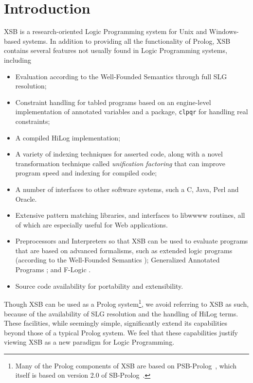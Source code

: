 \chapter{Introduction} \label{introduction}

XSB is a research-oriented Logic Programming system for Unix and
Windows-based systems.  In addition to providing all the
functionality of Prolog, XSB contains several features not usually
found in Logic Programming systems, including
\begin{itemize}
\item Evaluation according to the Well-Founded Semantics \cite{VGRS91}
  through full SLG resolution;
\item Constraint handling for tabled programs based on an engine-level
  implementation of annotated variables and a package, {\tt clpqr} for
  handling real constraints;
\item A compiled HiLog implementation;
\item A variety of indexing techniques for asserted code, along with a
  novel transformation technique called {\em unification factoring} that
  can improve program speed and indexing for compiled code;
\item A number of interfaces to other software systems, such a C, Java,
  Perl and Oracle.
\item Extensive pattern matching libraries, and interfaces to libwwww
  routines, all of which are especially useful for Web applications.
\item Preprocessors and Interpreters so that XSB can be used to evaluate
  programs that are based on advanced formalisms, such as extended logic
  programs (according to the Well-Founded Semantics \cite{ADP94});
Generalized Annotated Programs \cite{KiSu92}; and F-Logic \cite{KLW95}.
\item Source code availability for portability and extensibility.
\end{itemize}
 
Though XSB can be used as a Prolog system\footnote{Many of the Prolog
components of XSB are based on PSB-Prolog~\cite{Xu90}, which itself is
based on version 2.0 of SB-Prolog~\cite{Debr88}.}, we avoid referring
to XSB as such, because of the availability of SLG resolution and the
handling of HiLog terms.  These facilities, while seemingly simple,
significantly extend its capabilities beyond those of a typical Prolog
system. We feel that these capabilities justify viewing XSB as a new
paradigm for Logic Programming.

